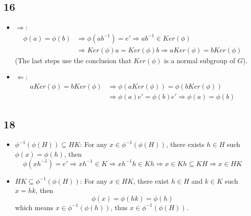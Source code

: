 \documentclass[draft]{article}
\begin{document}
		\subsection*{16}
			\begin{itemize}
				\item $\Rightarrow$:
					\begin{equation*}
						\begin{split}
							\phi(a) = \phi(b) & \Rightarrow \phi(ab^{-1}) = e' \Rightarrow
							ab^{-1} \in Ker(\phi) \\
							& \Rightarrow Ker(\phi)a = Ker(\phi)b \Rightarrow aKer(\phi) = bKer(\phi)
						\end{split}
					\end{equation*}
					(The last steps use the conclusion that $Ker(\phi)$ is a normal
					subgroup of $G$).
				\item $\Leftarrow$:
					\begin{equation*}
						\begin{split}
							aKer(\phi) = bKer(\phi) &\Rightarrow \phi(aKer(\phi))=\phi(bKer(\phi)) \\
							 & \Rightarrow \phi(a)e' = \phi(b)e' \Rightarrow \phi(a) = \phi(b)
						\end{split}
					\end{equation*}
			\end{itemize}
		\subsection*{18}
			\begin{itemize}
				\item $\phi^{-1}(\phi(H)) \subseteq HK$: For any $x \in
					\phi^{-1}(\phi(H))$, there exists $h \in H$ such $\phi(x) = \phi(h)$,
					then
					$$
					\phi(xh^{-1}) = e' \Rightarrow xh^{-1} \in K \Rightarrow xh^{-1}h \in
					Kh \Rightarrow x \in Kh \subseteq KH \Rightarrow x \in HK
					$$
				\item $HK \subseteq \phi^{-1}(\phi(H))$: For any $x \in HK$, there exist
					$h \in H$ and $k \in K$ such $x = hk$, then
					$$\phi(x) = \phi(hk) = \phi(h)$$
					which means $x \in \phi^{-1}(\phi(h))$, thus $x \in \phi^{-1}(\phi(H))$.
			\end{itemize}
\end{document}

